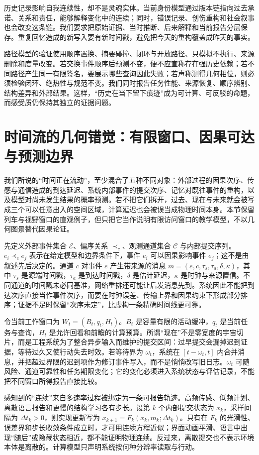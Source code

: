 历史记录影响自我连续性，却不是灵魂实体。当前身份模型通过版本链指向过去承诺、关系和责任，能够解释变化中的连续；同时，错误记录、创伤重构和社会叙事也会改变这条链。我们要求把原始证据、当时推断、后来解释和当前报告分层保存。重复回忆造成的新写入要有新时间戳，避免把今天的重构覆盖成昨天的事实。

路径模型的验证使用顺序置换、摘要碰撞、闭环与开放路径、只模拟不执行、来源删除和度量改变。若交换事件顺序后预测不变，便不应宣称存在强历史依赖；若不同路径产生同一有限签名，要展示哪些查询因此失败；若声称测得几何相位，则必须检验闭环、绝热性与规范不变。我们同时报告任务性能、来源恢复、顺序辨别、结构差异和外部结果。这样，“历史在当下留下痕迹”成为可计算、可反驳的命题，而感受质仍保持其独立的证据问题。

\section{时间流的几何错觉：有限窗口、因果可达与预测边界}
\label{sec:geometric_illusion_of_time_flow}
我们所说的“时间正在流动”，至少混合了五种不同对象：外部过程的因果次序、传感与通信造成的到达延迟、系统内部事件的提交次序、记忆对既往事件的重构，以及模型对尚未发生结果的概率预测。若不把它们拆开，过去、现在与未来就会被写成三个可以任意出入的空间区域，计算延迟也会被误当成物理时间本身。本节保留列车与视野窗口的直观例子，但只把它当作说明有限访问窗口的教学模型，不以几何图景替代因果论证。

先定义外部事件集合 $\mathcal E$、偏序关系 $\prec_c$、观测通道集合 $\mathcal C$ 与内部提交序列。$e_i\prec_c e_j$ 表示在给定模型和边界条件下，事件 $e_i$ 可以因果影响事件 $e_j$；这不是由叙述先后决定的。通道 $c$ 对事件 $e$ 产生带来源的消息 $m=(e,c,\tau_s,\tau_a,\delta,\kappa)$，其中 $\tau_s$ 是源端时间戳，$\tau_a$ 是到达时间戳，$\delta$ 是估计延迟，$\kappa$ 是时钟与来源置信。不同通道的时间戳未必同基准，网络重排还可能让后发消息先到。系统因此不能把到达次序直接当作事件次序，而要在时钟误差、传输上界和因果约束下形成部分排序；证据不足时保留“次序未定”，比虚构一条精确时间线更可靠。

令当前工作窗口为 $W_t=(B_t,q_t,H_t)$。$B_t$ 是容量有限的活动缓冲，$q_t$ 是当前任务与查询，$H_t$ 是允许回看和前瞻的计算预算。所谓“现在”不是零宽度的宇宙切片，而是工程系统为了整合异步输入而维护的提交区间：过早提交会漏掉迟到证据，等待过久又使行动失去时效。若等待界为 $\omega_t$，系统在 $[t-\omega_t,t]$ 内合并消息，并把超过界限的迟到项作为修订事件写入，而不是悄悄改写旧日志。$\omega_t$ 可随风险、通道可靠性和任务期限变化；它的变化必须进入系统状态与评估记录，不能把不同窗口所得报告直接比较。

感知到的“连续”来自多速率过程被绑定为一条可报告轨迹。高频传感、低频计划、离散语言报告和更慢的结构学习各有步长。设第 $k$ 个内部提交状态为 $x_k$，采样间隔为 $\Delta t_k>0$，则实现更新写为 $x_{k+1}=F_k(x_k,m_k;\Delta t_k)$。只有在 $F_k$ 的光滑性、误差界和步长收敛条件成立时，才可用连续方程近似；界面动画平滑、语言中出现“随后”或隐藏状态相近，都不能证明物理连续。反过来，离散提交也不表示环境本体是离散的。计算模型只声明系统按何种分辨率读取与行动。


